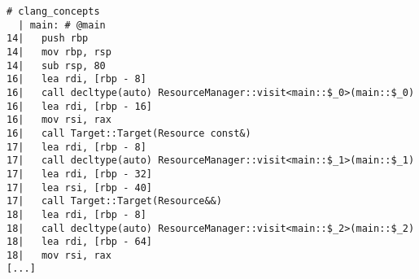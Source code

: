 \begin{lstlisting}[language={},numbers=none,title=\href{https://godbolt.org/z/5-QMbZ}{\texttt{godbolt.org/z/5-QMbZ}}]
# clang_concepts 
  | main: # @main
14|   push rbp
14|   mov rbp, rsp
14|   sub rsp, 80
16|   lea rdi, [rbp - 8]
16|   call decltype(auto) ResourceManager::visit<main::$_0>(main::$_0)
16|   lea rdi, [rbp - 16]
16|   mov rsi, rax
16|   call Target::Target(Resource const&)
17|   lea rdi, [rbp - 8]
17|   call decltype(auto) ResourceManager::visit<main::$_1>(main::$_1)
17|   lea rdi, [rbp - 32]
17|   lea rsi, [rbp - 40]
17|   call Target::Target(Resource&&)
18|   lea rdi, [rbp - 8]
18|   call decltype(auto) ResourceManager::visit<main::$_2>(main::$_2)
18|   lea rdi, [rbp - 64]
18|   mov rsi, rax
[...]
\end{lstlisting}
